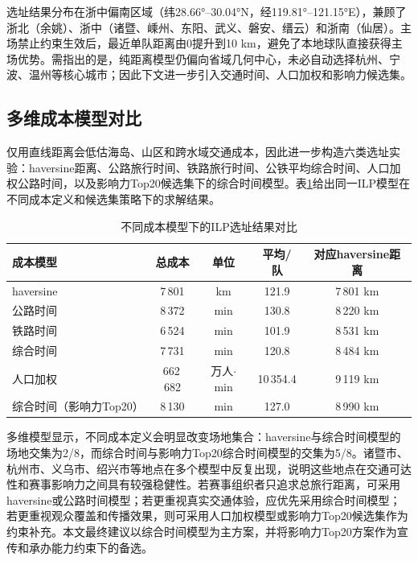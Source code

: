 \documentclass[12pt,a4paper]{article}
\begin{document}
选址结果分布在浙中偏南区域（纬28.66°--30.04°N，经119.81°--121.15°E），兼顾了浙北（余姚）、浙中（诸暨、嵊州、东阳、武义、磐安、缙云）和浙南（仙居）。主场禁止约束生效后，最近单队距离由0提升到10 km，避免了本地球队直接获得主场优势。需指出的是，纯距离模型仍偏向省域几何中心，未必自动选择杭州、宁波、温州等核心城市；因此下文进一步引入交通时间、人口加权和影响力候选集。

\subsection{多维成本模型对比}

仅用直线距离会低估海岛、山区和跨水域交通成本，因此进一步构造六类选址实验：haversine距离、公路旅行时间、铁路旅行时间、公铁平均综合时间、人口加权公路时间，以及影响力Top20候选集下的综合时间模型。表\ref{tab:q3_cost_models}给出同一ILP模型在不同成本定义和候选集策略下的求解结果。

\begin{table}[H]
  \centering
  \caption{不同成本模型下的ILP选址结果对比}
  \label{tab:q3_cost_models}
  \small
  \setlength{\tabcolsep}{4pt}
  \begin{tabular}{lcccc}
    \toprule
    成本模型 & 总成本 & 单位 & 平均/队 & 对应haversine距离 \\
    \midrule
    haversine & 7\,801 & km & 121.9 & 7\,801 km \\
    公路时间 & 8\,372 & min & 130.8 & 8\,220 km \\
    铁路时间 & 6\,524 & min & 101.9 & 8\,531 km \\
    综合时间 & 7\,731 & min & 120.8 & 8\,484 km \\
    人口加权 & 662\,682 & 万人$\cdot$min & 10\,354.4 & 9\,119 km \\
    综合时间（影响力Top20） & 8\,130 & min & 127.0 & 8\,990 km \\
    \bottomrule
  \end{tabular}
\end{table}

多维模型显示，不同成本定义会明显改变场地集合：haversine与综合时间模型的场地交集为2/8，而综合时间与影响力Top20综合时间模型的交集为5/8。诸暨市、杭州市、义乌市、绍兴市等地点在多个模型中反复出现，说明这些地点在交通可达性和赛事影响力之间具有较强稳健性。若赛事组织者只追求总旅行距离，可采用haversine或公路时间模型；若更重视真实交通体验，应优先采用综合时间模型；若更重视观众覆盖和传播效果，则可采用人口加权模型或影响力Top20候选集作为约束补充。本文最终建议以综合时间模型为主方案，并将影响力Top20方案作为宣传和承办能力约束下的备选。
\end{document}
